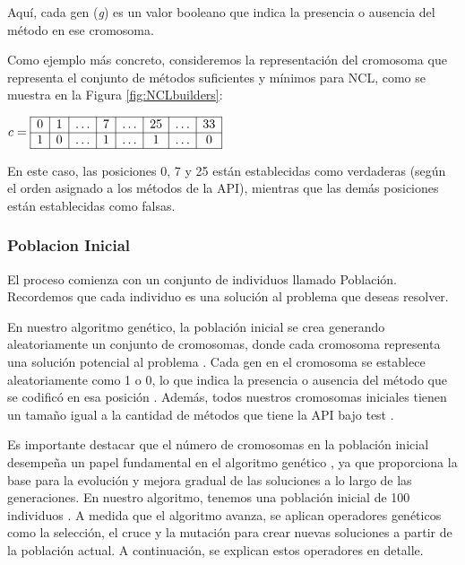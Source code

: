 Aquí, cada gen (\emph{g}) es un valor booleano que indica la presencia o
ausencia del método en ese cromosoma. 

Como ejemplo más concreto, consideremos la representación del cromosoma que representa el conjunto de métodos suficientes y mínimos para NCL, como se muestra en la Figura \ref{fig:NCLbuilders}:
\begin{center}
$c = \begin{array}{|*{8}{c|}}
\hline
0 & 1 & \ldots & 7 & \ldots & 25 & \ldots & 33 \\
\hline
1 & 0 & \ldots & 1 & \ldots & 1 & \ldots & 0 \\
\hline
\end{array}$
\end{center}

En este caso, las posiciones 0, 7 y 25 están establecidas como verdaderas (según el orden asignado a los métodos de la API), mientras que las demás posiciones están establecidas como falsas.


\subsubsection{Poblacion Inicial }

El proceso comienza con un conjunto de individuos llamado Población. Recordemos
que cada individuo es una solución  al problema que deseas resolver.

En nuestro algoritmo genético, la población inicial se crea generando
aleatoriamente un conjunto de cromosomas, donde cada cromosoma representa una
solución potencial al problema . Cada gen
en el cromosoma se establece aleatoriamente como 1 o 0, lo que indica la
presencia o ausencia del método que se codificó en esa posición .
Además, todos nuestros cromosomas iniciales tienen un tamaño igual a la cantidad
de métodos que tiene la API bajo test .

Es importante destacar que el número de cromosomas en la población inicial
desempeña un papel fundamental en el algoritmo genético , ya que proporciona la base para la evolución y mejora gradual de las
soluciones a lo largo de las generaciones. En nuestro algoritmo, tenemos una
población inicial de 100 individuos . A medida que el algoritmo avanza, se
aplican operadores genéticos como la selección, el cruce  y
la mutación para crear nuevas soluciones  a partir de la población actual. A continuación, se explican estos operadores en detalle.

